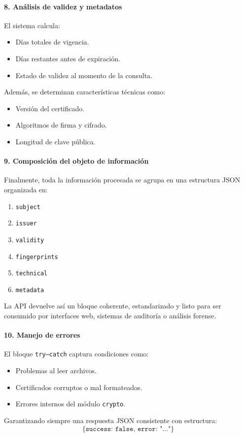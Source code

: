 \paragraph{8. Análisis de validez y metadatos}
El sistema calcula:
\begin{itemize}
  \item Días totales de vigencia.
  \item Días restantes antes de expiración.
  \item Estado de validez al momento de la consulta.
\end{itemize}

Además, se determinan características técnicas como:
\begin{itemize}
  \item Versión del certificado.
  \item Algoritmos de firma y cifrado.
  \item Longitud de clave pública.
\end{itemize}

\paragraph{9. Composición del objeto de información}
Finalmente, toda la información procesada se agrupa en una estructura JSON organizada en:
\begin{enumerate}
  \item \texttt{subject}
  \item \texttt{issuer}
  \item \texttt{validity}
  \item \texttt{fingerprints}
  \item \texttt{technical}
  \item \texttt{metadata}
\end{enumerate}
La API devuelve así un bloque coherente, estandarizado y listo para ser consumido por interfaces web, sistemas de auditoría o análisis forense.

\paragraph{10. Manejo de errores}
El bloque \texttt{try--catch} captura condiciones como:
\begin{itemize}
  \item Problemas al leer archivos.
  \item Certificados corruptos o mal formateados.
  \item Errores internos del módulo \texttt{crypto}.
\end{itemize}
Garantizando siempre una respuesta JSON consistente con estructura:
\[
\{ \texttt{success: false, error: "..."} \}
\]

